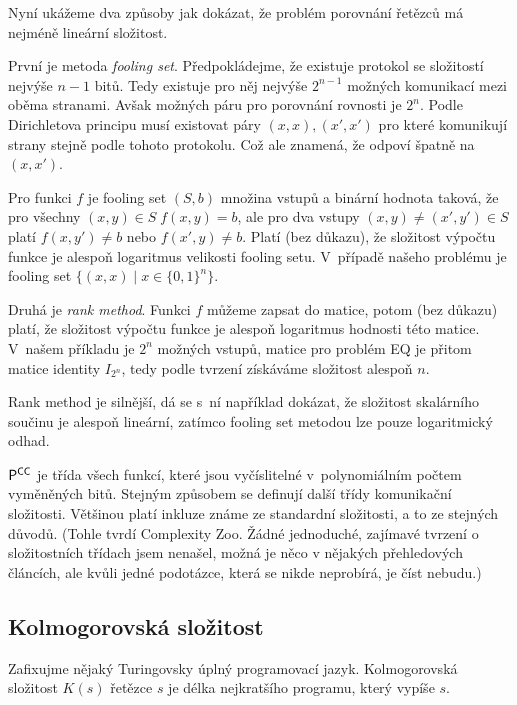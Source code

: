 Nyní ukážeme dva způsoby jak dokázat, že problém porovnání řetězců má
nejméně lineární složitost.

První je metoda {\em fooling set}.
Předpokládejme, že existuje protokol se složitostí nejvýše $n-1$ bitů.
Tedy existuje pro něj nejvýše $2^{n-1}$ možných komunikací mezi oběma
stranami. Avšak možných páru pro porovnání rovnosti je $2^n$.
Podle Dirichletova principu musí existovat páry $(x,x), (x',x')$ pro
které komunikují strany stejně podle tohoto protokolu.
Což ale znamená, že odpoví špatně na $(x,x')$.

Pro funkci $f$ je fooling set $(S,b)$ množina vstupů
a binární hodnota taková, že pro všechny $(x,y) \in S \; f(x,y) = b$,
ale pro dva vstupy $(x,y) \neq (x',y') \in S$ platí
$f(x,y') \neq b$ nebo $f(x',y) \neq b$.
Platí (bez důkazu), že složitost výpočtu funkce je alespoň logaritmus velikosti
fooling setu.
V~případě našeho problému je fooling set $\{(x,x) \mid x \in \{0,1\}^n \}$.


Druhá je {\em rank method}. Funkci $f$ můžeme zapsat do matice,
potom (bez důkazu) platí, že složitost výpočtu funkce je alespoň
logaritmus hodnosti této matice. V~našem příkladu je $2^n$ možných
vstupů, matice pro problém EQ je přitom matice identity $I_{2^n}$,
tedy podle tvrzení získáváme složitost alespoň $n$.

Rank method je silnější, dá se s~ní například dokázat, že složitost
skalárního součinu je alespoň lineární, zatímco fooling set metodou lze
pouze logaritmický odhad.

${\mathsf{P}}^{{\mathsf{CC}}}$ je třída všech funkcí, které jsou vyčíslitelné
v~polynomiálním počtem vyměněných bitů. Stejným způsobem se definují
další třídy komunikační složitosti. Většinou platí inkluze známe ze
standardní složitosti, a to ze stejných důvodů. (Tohle tvrdí Complexity
Zoo. Žádné jednoduché, zajímavé tvrzení o složitostních třídach jsem
nenašel, možná je něco v nějakých přehledových článcích, ale kvůli jedné
podotázce, která se nikde neprobírá, je číst nebudu.)


\subsection{Kolmogorovská složitost}

Zafixujme nějaký Turingovsky úplný programovací jazyk.  Kolmogorovská
složitost $K(s)$ řetězce $s$ je délka nejkratšího programu, který vypíše
$s$.

